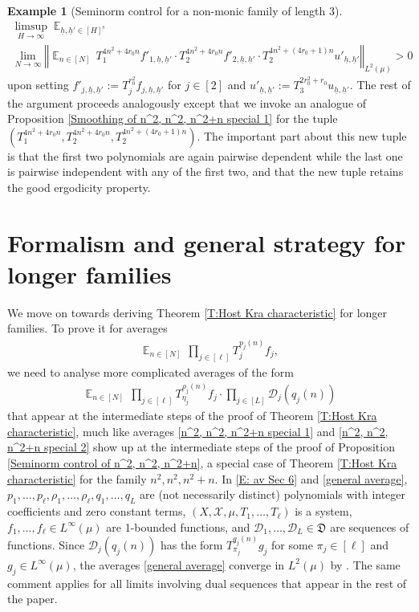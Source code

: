 \documentclass[11pt]{amsart}
\theoremstyle{definition}
\newtheorem{example}{Example}
\newcommand{\CD}{{\mathcal D}}
\newcommand{\CX}{{\mathcal X}}
\newcommand{\FD}{{\mathfrak D}}
\newcommand{\uh}{{\underline{h}}}
\newcommand{\norm}[1]{\left\Vert #1\right\Vert}
\DeclareMathOperator*{\E}{\mathbb{E}}
\begin{document}
\begin{example}[Seminorm control for a non-monic family of length 3]
\begin{multline*}
    \limsup_{H\to\infty}\E_{\uh,\uh'\in [H]^{s}} \\ \lim_{N\to\infty}\norm{ \E_{n\in[N]} \, T_1^{4n^2 + 4r_0 n} f'_{1, \uh, \uh'}\cdot T_2^{4n^2 + 4r_0 n} f'_{2, \uh, \uh'}\cdot T_2^{4n^2 + (4r_0+1)n}u'_{\uh,\uh'}}_{L^2(\mu)}>0
\end{multline*}
upon setting $f'_{j, \uh, \uh'} := T_j^{r_0^2} f_{j, \uh, \uh'}$ for $j\in[2]$ and $u'_{\uh, \uh'} := T_3^{2r_0^2 + r_0} u_{\uh, \uh'}$. The rest of the argument proceeds analogously except that we invoke an analogue of Proposition \ref{Smoothing of n^2, n^2, n^2+n special 1} for the tuple $(T_1^{4n^2 + 4r_0 n}, T_2^{4n^2 + 4r_0 n}, T_2^{4n^2 + (4r_0+1)n})$. The important part about this new tuple is that the first two polynomials are again pairwise dependent while the last one is pairwise independent with any of the first two, and that the new tuple retains the good ergodicity property.
\end{example}


\section{Formalism and general strategy for longer families}\label{S: longer families}

We move on towards deriving Theorem \ref{T:Host Kra characteristic} for longer families. To prove it for averages
\begin{align}\label{E: av Sec 6}
    \E_{n\in [N]} \,\prod_{j\in[\ell]}T_{j}^{p_j(n)}f_j,
\end{align}
 we need to analyse more complicated averages of the form
\begin{align}\label{general average}
    \E_{n\in [N]} \,\prod_{j\in[\ell]}T_{\eta_j}^{\rho_j(n)}f_j \cdot \prod_{j\in[L]}\CD_{j}(q_j(n))
\end{align}
that  appear at the intermediate steps of the proof of Theorem \ref{T:Host Kra characteristic}, much like averages \eqref{n^2, n^2, n^2+n special 1} and \eqref{n^2, n^2, n^2+n special 2} show up at the intermediate steps of the proof of Proposition \ref{Seminorm control of n^2, n^2, n^2+n}, a special case of Theorem \ref{T:Host Kra characteristic} for the family $n^2, n^2, n^2+n$. In \eqref{E: av Sec 6} and \eqref{general average}, $p_1, \ldots, p_\ell, \rho_1, \ldots, \rho_\ell,  q_1, \ldots, q_L$ are (not necessarily distinct) polynomials with integer coefficients and  zero constant terms, $(X, \CX, \mu, T_1, \ldots, T_\ell)$ is a system, $f_1, \ldots, f_\ell\in L^\infty(\mu)$ are 1-bounded functions, and $\CD_1, \ldots, \CD_L\in\FD$ are sequences of functions. Since $\CD_{j}(q_j(n))$ has the form $T_{\pi_j}^{q_j(n)}g_j$ for some $\pi_j\in[\ell]$ and $g_j\in L^\infty(\mu)$, the averages \eqref{general average} converge in $L^2(\mu)$ by \cite{Wal12}. The same comment applies for all limits involving dual sequences that appear in the rest of the paper.
\end{document}
